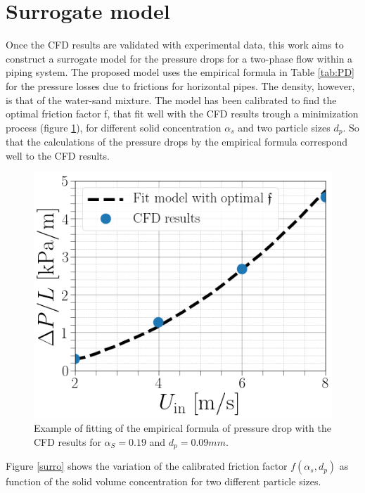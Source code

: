 \documentclass[11pt]{report}
\begin{document}
\begin{minipage}[t]{0.35\textwidth}
\begin{minipage}[t]{0.5\textwidth}
\begin{minipage}[t]{0.35\textwidth}
\begin{minipage}[t]{0.35\textwidth}
\section{Surrogate model}
%
 Once the CFD results are validated with experimental data, this work aims to construct a surrogate model for the pressure drops for a two-phase flow within a piping system. 
 The proposed model uses the empirical formula in Table \ref{tab:PD} for the pressure losses due to frictions for horizontal pipes. 
 The density, however, is that of the water-sand mixture. 
 The model has been calibrated to find the optimal friction factor f, that fit well with the CFD results trough a minimization process (figure \ref{optimal}), for different solid concentration $\alpha_s$ and two particle sizes $d_p$. 
 So that the calculations of the pressure drops by the empirical formula correspond well to the CFD results. 
%
 \begin{figure}[ht!]
 \begin{center}
 \includegraphics[scale = 0.35]{figs/alpha3D0.png}
 \caption{Example of fitting of the empirical formula of pressure drop with the CFD results for $\alpha_S = 0.19$ and $d_p = 0.09 mm$.}
 \label{optimal}
 \end{center}
 \end{figure}
%
 Figure \ref{surro} shows the variation of the calibrated friction factor $f(\alpha_s,d_p)$ as function of the solid volume concentration for two different particle sizes.
 \begin{figure}[ht!]
 \begin{center}

\end{center}
\end{figure}
\end{minipage}
\end{minipage}
\end{minipage}
\end{minipage}
\end{document}
